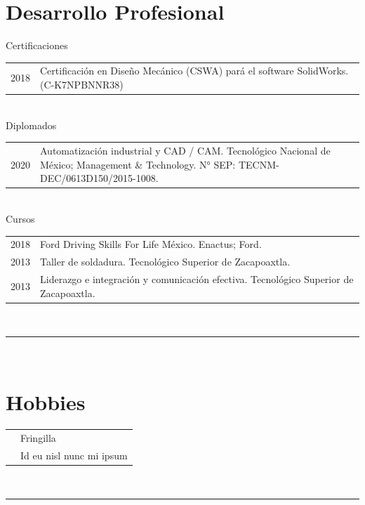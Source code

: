 \documentclass[oneside]{article}
\begin{document}
{\begin{minipage}[t][\dimexpr\textheight-2\fboxrule-2\fboxsep\relax][t]{\dimexpr0.4\textwidth-2\fboxrule-2\fboxsep\relax}
        \section*{\large Desarrollo Profesional}
        {Certificaciones}
        \begin{tabularx}{\textwidth}{cY}
            2018 & Certificación en Diseño Mecánico (CSWA) pará el software SolidWorks. \mbox{(C-K7NPBNNR38)} \\
        \end{tabularx}
        \vspace{.2cm}
        \\
        {Diplomados}\\
        \begin{tabularx}{\textwidth}{cY}
            2020 & Automatización industrial y CAD / CAM. Tecnológico Nacional de México; Management \& Technology. N° SEP: TECNM-DEC/0613D150/2015-1008. \\
        \end{tabularx}
        \vspace{.2cm}
        \\
        {Cursos}
        \begin{tabularx}{\textwidth}{cY}
            2018 & Ford Driving Skills For Life México. Enactus; Ford. \\
            2013 & Taller de soldadura. Tecnológico Superior de Zacapoaxtla. \\
            2013 & Liderazgo e integración y comunicación efectiva. Tecnológico Superior de Zacapoaxtla. \\
        \end{tabularx}
        \vspace{.3cm}
        \\
        \rule{\linewidth}{0.4pt}
        \\
        \section*{\large Hobbies}
        \begin{tabularx}{\textwidth}{cY}
            \faCamera{} & Fringilla \\
            \faCogs{} & Id eu nisl nunc mi ipsum \\
        \end{tabularx}
        \vspace{.3cm}
        \\
        \rule{\linewidth}{0.4pt}
    \end{minipage}%
}%
\end{document}

